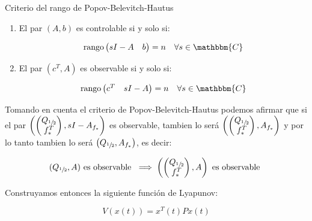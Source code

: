         \begin{nota}
            Criterio del rango de Popov-Belevitch-Hautus
            \begin{enumerate}[i]
                \item El par $(A, b)$ es controlable si y solo si:

                \begin{equation*}
                    \rango{\begin{pmatrix} sI - A & b \end{pmatrix}} = n \quad \forall s \in \mathbbm{C}
                \end{equation*}

                \item El par $(c^T, A)$ es observable si y solo si:

                \begin{equation*}
                    \rango{\begin{pmatrix} c^T & sI - A \end{pmatrix}} = n \quad \forall s \in \mathbbm{C}
                \end{equation*}
            \end{enumerate}
        \end{nota}

        Tomando en cuenta el criterio de Popov-Belevitch-Hautus podemos afirmar que si el par $\left( \begin{pmatrix} Q_{\sfrac{1}{2}} \\ f_*^T \end{pmatrix} , sI - A_{f_*} \right)$ es observable, tambien lo será $\left( \begin{pmatrix} Q_{\sfrac{1}{2}} \\ f_*^T \end{pmatrix} , A_{f_*} \right)$ y por lo tanto tambien lo será $\left( Q_{\sfrac{1}{2}} , A_{f_*} \right)$, es decir:

        \begin{equation*}
            (Q_{\sfrac{1}{2}}, A) \text{ es observable } \implies \left( \begin{pmatrix}Q_{\sfrac{1}{2}} \\ f_*^T \end{pmatrix}, A \right) \text{ es observable }
        \end{equation*}

        Construyamos entonces la siguiente función de Lyapunov:

        \begin{equation}
            V(x(t)) = x^T(t) P x(t)
        \end{equation}

